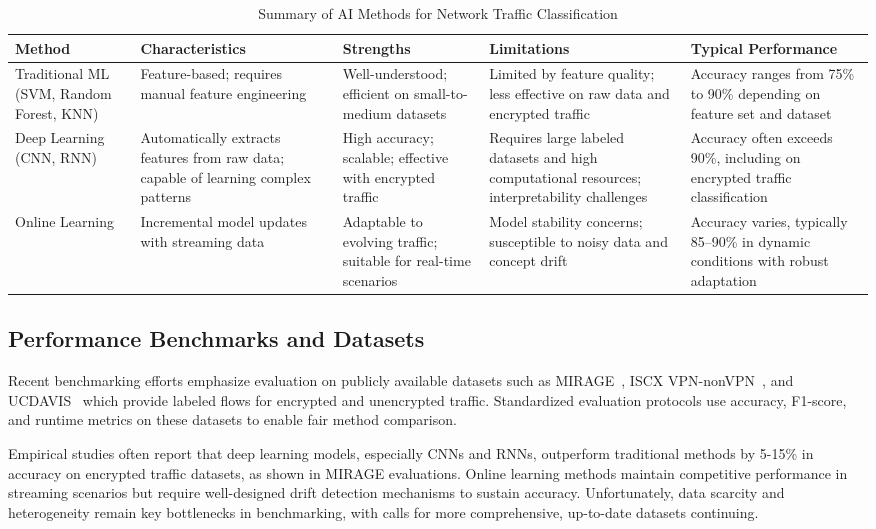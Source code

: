 \documentclass[sigconf]{acmart}
\begin{document}
\begin{table*}[htbp]
\centering
\caption{Summary of AI Methods for Network Traffic Classification}
\label{tab:ai_methods}
\begin{adjustbox}{max width=\textwidth}
\begin{tabular}{@{}lllll@{}}
\toprule
\textbf{Method} & \textbf{Characteristics} & \textbf{Strengths} & \textbf{Limitations} & \textbf{Typical Performance} \\
\midrule
Traditional ML (SVM, Random Forest, KNN) & Feature-based; requires manual feature engineering & Well-understood; efficient on small-to-medium datasets & Limited by feature quality; less effective on raw data and encrypted traffic & Accuracy ranges from 75\% to 90\% depending on feature set and dataset \\
Deep Learning (CNN, RNN) & Automatically extracts features from raw data; capable of learning complex patterns & High accuracy; scalable; effective with encrypted traffic & Requires large labeled datasets and high computational resources; interpretability challenges & Accuracy often exceeds 90\%, including on encrypted traffic classification \\
Online Learning & Incremental model updates with streaming data & Adaptable to evolving traffic; suitable for real-time scenarios & Model stability concerns; susceptible to noisy data and concept drift & Accuracy varies, typically 85–90\% in dynamic conditions with robust adaptation \\
\bottomrule
\end{tabular}
\end{adjustbox}
\end{table*}

\subsection{Performance Benchmarks and Datasets}

Recent benchmarking efforts emphasize evaluation on publicly available datasets such as MIRAGE~\cite{mirage2021dataset}, ISCX VPN-nonVPN~\cite{iscxvpn2016}, and UCDAVIS~\cite{ucdavis2019traffic} which provide labeled flows for encrypted and unencrypted traffic. Standardized evaluation protocols use accuracy, F1-score, and runtime metrics on these datasets to enable fair method comparison.

Empirical studies often report that deep learning models, especially CNNs and RNNs, outperform traditional methods by 5-15\% in accuracy on encrypted traffic datasets, as shown in MIRAGE evaluations. Online learning methods maintain competitive performance in streaming scenarios but require well-designed drift detection mechanisms to sustain accuracy. Unfortunately, data scarcity and heterogeneity remain key bottlenecks in benchmarking, with calls for more comprehensive, up-to-date datasets continuing.
\end{document}
